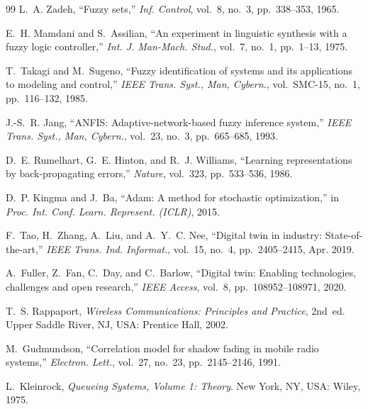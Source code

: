 \documentclass[conference]{IEEEtran}
\begin{document}
\begin{thebibliography}{99}
L.~A. Zadeh, ``Fuzzy sets,'' \emph{Inf. Control}, vol.~8, no.~3, pp.~338--353, 1965.

E.~H. Mamdani and S.~Assilian, ``An experiment in linguistic synthesis with a fuzzy logic controller,''
\emph{Int. J. Man-Mach. Stud.}, vol.~7, no.~1, pp.~1--13, 1975.

T.~Takagi and M.~Sugeno, ``Fuzzy identification of systems and its applications to modeling and control,''
\emph{IEEE Trans. Syst., Man, Cybern.}, vol.~SMC-15, no.~1, pp.~116--132, 1985.

J.-S.~R. Jang, ``ANFIS: Adaptive-network-based fuzzy inference system,''
\emph{IEEE Trans. Syst., Man, Cybern.}, vol.~23, no.~3, pp.~665--685, 1993.

D.~E. Rumelhart, G.~E. Hinton, and R.~J. Williams, ``Learning representations by back-propagating errors,''
\emph{Nature}, vol.~323, pp.~533--536, 1986.

D.~P. Kingma and J.~Ba, ``Adam: A method for stochastic optimization,'' in \emph{Proc. Int. Conf. Learn. Represent. (ICLR)}, 2015.

F.~Tao, H.~Zhang, A.~Liu, and A.~Y.~C. Nee, ``Digital twin in industry: State-of-the-art,''
\emph{IEEE Trans. Ind. Informat.}, vol.~15, no.~4, pp.~2405--2415, Apr. 2019.

A.~Fuller, Z.~Fan, C.~Day, and C.~Barlow, ``Digital twin: Enabling technologies, challenges and open research,''
\emph{IEEE Access}, vol.~8, pp.~108952--108971, 2020.

T.~S. Rappaport, \emph{Wireless Communications: Principles and Practice}, 2nd~ed. Upper Saddle River, NJ, USA: Prentice Hall, 2002.

M.~Gudmundson, ``Correlation model for shadow fading in mobile radio systems,''
\emph{Electron. Lett.}, vol.~27, no.~23, pp.~2145--2146, 1991.

L.~Kleinrock, \emph{Queueing Systems, Volume 1: Theory}. New York, NY, USA: Wiley, 1975.

\end{thebibliography}
\end{document}
